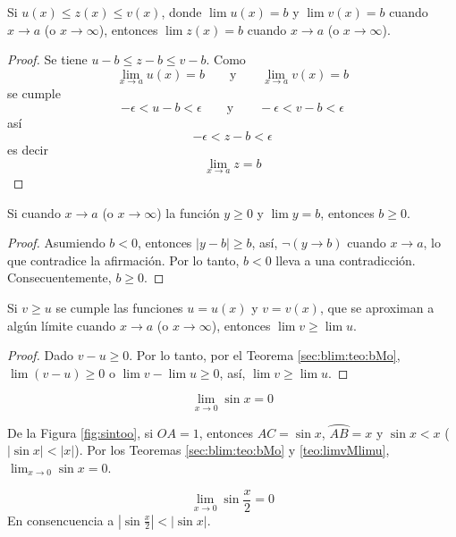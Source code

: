 \begin{theorem} \label{teo:uzvlimb}
  Si $u(x) \le z(x) \le v(x)$, donde $\lim u(x) = b$ y $\lim v(x) = b$ cuando $x \to a$ (o $x \to \infty$), entonces $\lim z(x) = b$ cuando $x \to a$ (o $x \to \infty$).
\end{theorem}

\begin{proof}
  Se tiene $u - b \le z - b \le v - b$. Como
  $$\lim_{x \to a} u(x) = b \qquad \mbox{y} \qquad \lim_{x \to a} v(x) = b$$
  se cumple
  $$-\epsilon < u - b < \epsilon \qquad \mbox{y} \qquad -\epsilon < v - b < \epsilon$$
  así
  $$-\epsilon < z - b < \epsilon$$
  es decir
  $$\lim_{x \to a} z = b$$
\end{proof}


\begin{theorem} \label{sec:blim:teo:bMo}
  Si cuando $x \to a$ (o $x \to \infty$) la función $y \ge 0$ y $\lim y = b$, entonces $b \ge 0$.
\end{theorem}

\begin{proof}
  Asumiendo \( b < 0 \), entonces \( |y - b| \ge b \), así, \( \neg (y \to b) \) cuando \( x \to a \), lo que contradice la afirmación. Por lo tanto, \( b < 0 \) lleva a una contradicción. Consecuentemente, \( b \ge 0 \).
\end{proof}


\begin{theorem} \label{teo:limvMlimu}
  Si $v \ge u$ se cumple las funciones $u = u(x)$ y $v = v(x)$, que se aproximan a algún límite cuando $x \to a$ (o $x \to \infty$), entonces $\lim v \ge \lim u$.
\end{theorem}

\begin{proof}
  Dado \( v - u \ge 0 \). Por lo tanto, por el Teorema \ref{sec:blim:teo:bMo}, \( \lim (v - u) \ge 0 \) o \( \lim v - \lim u \ge 0 \), así, \( \lim v \ge \lim u \).
\end{proof}


\begin{example}
  \[ \lim_{x \to 0} \sin x = 0 \]

  De la Figura \ref{fig:sintoo}, si \( OA = 1 \), entonces \( AC = \sin x \), \( \wideparen{AB} = x \) y \( \sin x < x \) (\( |\sin x| < |x| \)). Por los Teoremas \ref{sec:blim:teo:bMo} y \ref{teo:limvMlimu}, \( \lim_{x \to 0} \sin x = 0 \).
\end{example}


\begin{example} \label{ej:sinxl2}
  \[ \lim_{x \to 0} \sin \frac{x}{2} = 0\]
  En consencuencia a \( \left| \sin \frac{x}{2} \right| < |\sin x| \).
\end{example}


